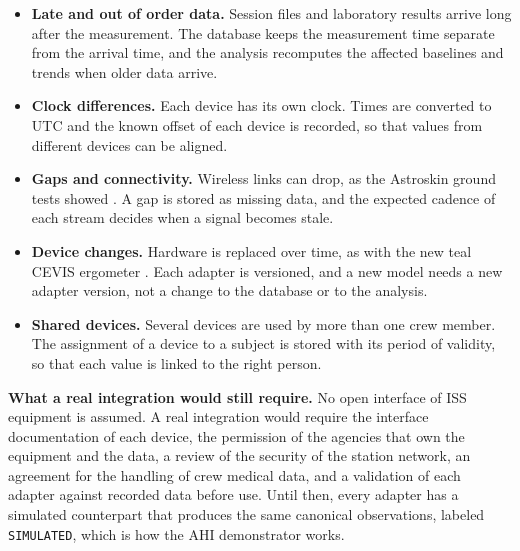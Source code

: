 \begin{itemize}
\item \textbf{Late and out of order data.} Session files and laboratory results arrive long after the measurement. The database keeps the measurement time separate from the arrival time, and the analysis recomputes the affected baselines and trends when older data arrive.
\item \textbf{Clock differences.} Each device has its own clock. Times are converted to UTC and the known offset of each device is recorded, so that values from different devices can be aligned.
\item \textbf{Gaps and connectivity.} Wireless links can drop, as the Astroskin ground tests showed \cite{toscano2017astroskin}. A gap is stored as missing data, and the expected cadence of each stream decides when a signal becomes stale.
\item \textbf{Device changes.} Hardware is replaced over time, as with the new teal CEVIS ergometer \cite{nasa_jsc_exercise_countermeasures}. Each adapter is versioned, and a new model needs a new adapter version, not a change to the database or to the analysis.
\item \textbf{Shared devices.} Several devices are used by more than one crew member. The assignment of a device to a subject is stored with its period of validity, so that each value is linked to the right person.
\end{itemize}

\medskip\noindent\textbf{What a real integration would still require.} No open interface of ISS equipment is assumed. A real integration would require the interface documentation of each device, the permission of the agencies that own the equipment and the data, a review of the security of the station network, an agreement for the handling of crew medical data, and a validation of each adapter against recorded data before use. Until then, every adapter has a simulated counterpart that produces the same canonical observations, labeled \texttt{SIMULATED}, which is how the AHI demonstrator works.
